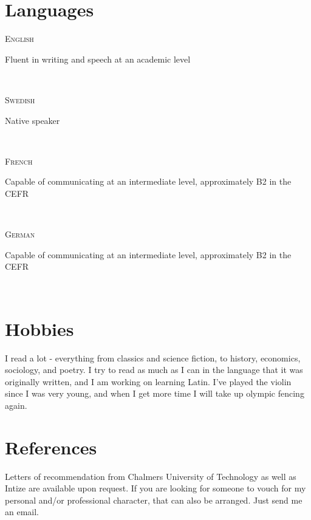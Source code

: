 \documentclass[letterpaper,
		10pt]{article}
\let\oldhref\href
\renewcommand{\href}[3][blue]{\oldhref{#2}{\color{#1}{#3}}}
\newcommand{\entry}[4]{
\ifthenelse{\isempty{#3}}
{\slimentry{#1}{#2}}{

\begin{minipage}[t]{.15\linewidth}
\hfill \textsc{#1}
\end{minipage}
\hfill\vline\hfill
\begin{minipage}[t]{.80\linewidth}
{\bf#2}\\\textit{#3} \small{#4}
\end{minipage}\\
\vspace{.2cm}
}}
\newcommand{\slimentry}[2]{
\begin{minipage}[t]{.15\linewidth}
\hfill \textsc{#1}
\end{minipage}
\hfill\vline\hfill
\begin{minipage}[t]{.80\linewidth}
#2
\end{minipage}\\
\vspace{.25cm}
}
\newcommand{\sentry}[2]{
\begin{minipage}[t]{.15\linewidth}
\hfill \textsc{#1}
\end{minipage}
\hfill\vline\hfill
\begin{minipage}[t]{.80\linewidth}
#2
\end{minipage}\\
\vspace{-.15cm}
}%
\begin{document}
\section{Languages}

\sentry{English}{Fluent in writing and speech at an academic level}

\sentry{Swedish}{Native speaker}

\sentry{French}{Capable of communicating at an intermediate level, approximately B2 in the CEFR}

\sentry{German}{Capable of communicating at an intermediate level, approximately B2 in the CEFR}

\section{Hobbies}

I read a lot - everything from classics and science fiction, to history, economics, sociology, and poetry.
I try to read as much as I can in the language that it was originally written, and I am working
on learning Latin. I've played the violin since I was very young, and when I get more time
I will take up olympic fencing again.


\section{References}
    
Letters of recommendation from Chalmers University of Technology as well as Intize are available upon request.
If you are looking for someone to vouch for my personal and/or professional character, that can also be arranged.
Just send me an email.
\end{document}
